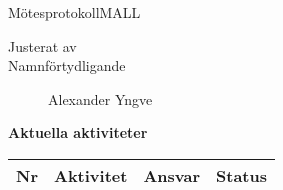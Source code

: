 \documentclass[titlepage, a4paper]{article}
\begin{document}
\begin{projektmote}{Mötesprotokoll}{MALL}
\end{projektmote}

\vspace{15mm}
\begin{description}
\item[Justerat av]
\item[Namnförtydligande] \Large{Alexander Yngve} %
\end{description}

\newpage
\textbf{\Large Aktuella aktiviteter}
\begin{center}
\begin{tabularx}{\textwidth}{| p{4mm} | X | p{13.5mm} | X |}
	\hline
	\textbf{Nr} & \textbf{Aktivitet} & \textbf{Ansvar} & \textbf{Status} \\\hline	
\end{tabularx}
\end{center}
\end{document}
